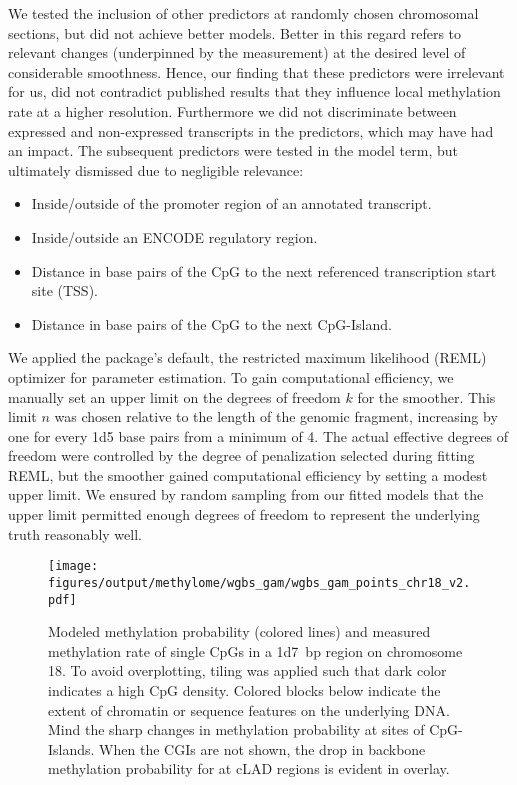 We tested the inclusion of other predictors at randomly chosen chromosomal sections, but did not achieve better models. Better in this regard refers to relevant changes (underpinned by the measurement) at the desired level of considerable smoothness. Hence, our finding that these predictors were irrelevant for us, did not contradict published results that they influence local methylation rate at a higher resolution\cite{Stadler2011,Ziller2013,Iurlaro2017}. Furthermore we did not discriminate between expressed and non-expressed transcripts in the predictors, which may have had an impact. The subsequent predictors were tested in the model term, but ultimately dismissed due to negligible relevance: 

\begin{itemize}
	\item Inside/outside of the promoter region of an annotated transcript.
	\item Inside/outside an ENCODE regulatory region.
	\item Distance in base pairs of the CpG to the next referenced transcription start site (TSS).
	\item Distance in base pairs of the CpG to the next CpG-Island.
\end{itemize}

We applied the package's default, the restricted maximum likelihood (REML) optimizer for parameter estimation. To gain computational efficiency, we manually set an upper limit on the degrees of freedom $k$ for the smoother. This limit $n$ was chosen relative to the length of the genomic fragment, increasing by one for every \num{1d5} base pairs from a minimum of \num{4}. The actual effective degrees of freedom were controlled by the degree of penalization selected during fitting REML, but the smoother gained computational efficiency by setting a modest upper limit. We ensured by random sampling from our fitted models that the upper limit permitted enough degrees of freedom to represent the underlying truth reasonably well. 

\begin{figure}[!bht]
	\centering
	\texttt{[image: figures/output/methylome/wgbs\_gam/wgbs\_gam\_points\_chr18\_v2.pdf]} 
	\caption[Modeled methylation within an annotated sample region on chr18]{Modeled methylation probability (colored lines) and measured methylation rate of single CpGs in a \SI{1d7}{bp} region on chromosome \num{18}. To avoid overplotting, tiling was applied such that dark color indicates a high CpG density. Colored blocks below indicate the extent of chromatin or sequence features on the underlying DNA. Mind the sharp changes in methylation probability at sites of CpG-Islands. When the CGIs are not shown, the drop in backbone methylation probability for \dnmtchip \kitpos at cLAD regions is evident in overlay.}
	\label{fig:wgbs_gam_points_chr18.pdf}
\end{figure}

